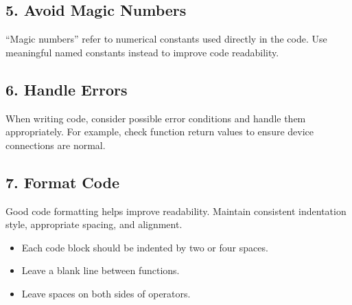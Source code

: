 \documentclass[a4paper,11pt,english]{sphinxmanual}
\begin{document}
\subsection{5. Avoid Magic Numbers}
\label{\detokenize{Get_Started_with_Arduino/Sketch_Writing_Rules:avoid-magic-numbers}}
\sphinxAtStartPar
“Magic numbers” refer to numerical constants used directly in the code. Use meaningful named constants instead to improve code readability.

\begin{sphinxVerbatim}[commandchars=\\\{\}]
\end{sphinxVerbatim}


\subsection{6. Handle Errors}
\label{\detokenize{Get_Started_with_Arduino/Sketch_Writing_Rules:handle-errors}}
\sphinxAtStartPar
When writing code, consider possible error conditions and handle them appropriately. For example, check function return values to ensure device connections are normal.

\begin{sphinxVerbatim}[commandchars=\\\{\}]
\end{sphinxVerbatim}


\subsection{7. Format Code}
\label{\detokenize{Get_Started_with_Arduino/Sketch_Writing_Rules:format-code}}
\sphinxAtStartPar
Good code formatting helps improve readability. Maintain consistent indentation style, appropriate spacing, and alignment.
\begin{itemize}
\item {} 
\sphinxAtStartPar
Each code block should be indented by two or four spaces.

\item {} 
\sphinxAtStartPar
Leave a blank line between functions.

\item {} 
\sphinxAtStartPar
Leave spaces on both sides of operators.

\end{itemize}
\end{document}
